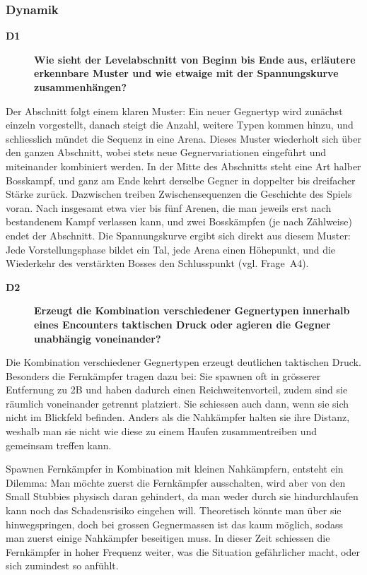 \documentclass[../Main.tex]{subfiles}
\begin{document}
\subsubsection{Dynamik}

\begin{description}
    \item[\textbf{D1}] \textbf{Wie sieht der Levelabschnitt von Beginn bis Ende aus, erläutere erkennbare Muster und wie etwaige mit der Spannungskurve zusammenhängen?}
\end{description}

Der Abschnitt folgt einem klaren Muster: Ein neuer Gegnertyp wird zunächst einzeln vorgestellt, danach steigt die Anzahl, weitere Typen kommen hinzu, und schliesslich mündet die Sequenz in eine Arena. Dieses Muster wiederholt sich über den ganzen Abschnitt, wobei stets neue Gegnervariationen eingeführt und miteinander kombiniert werden. In der Mitte des Abschnitts steht eine Art halber Bosskampf, und ganz am Ende kehrt derselbe Gegner in doppelter bis dreifacher Stärke zurück. Dazwischen treiben Zwischensequenzen die Geschichte des Spiels voran. Nach insgesamt etwa vier bis fünf Arenen, die man jeweils erst nach bestandenem Kampf verlassen kann, und zwei Bosskämpfen (je nach Zählweise) endet der Abschnitt. Die Spannungskurve ergibt sich direkt aus diesem Muster: Jede Vorstellungsphase bildet ein Tal, jede Arena einen Höhepunkt, und die Wiederkehr des verstärkten Bosses den Schlusspunkt (vgl. Frage~A4).

\begin{description}
    \item[\textbf{D2}] \textbf{Erzeugt die Kombination verschiedener Gegnertypen innerhalb eines Encounters taktischen Druck oder agieren die Gegner unabhängig voneinander?}
\end{description}

Die Kombination verschiedener Gegnertypen erzeugt deutlichen taktischen Druck. Besonders die Fernkämpfer tragen dazu bei: Sie spawnen oft in grösserer Entfernung zu 2B und haben dadurch einen Reichweitenvorteil, zudem sind sie räumlich voneinander getrennt platziert. Sie schiessen auch dann, wenn sie sich nicht im Blickfeld befinden. Anders als die Nahkämpfer halten sie ihre Distanz, weshalb man sie nicht wie diese zu einem Haufen zusammentreiben und gemeinsam treffen kann.

Spawnen Fernkämpfer in Kombination mit kleinen Nahkämpfern, entsteht ein Dilemma: Man möchte zuerst die Fernkämpfer ausschalten, wird aber von den Small Stubbies physisch daran gehindert, da man weder durch sie hindurchlaufen kann noch das Schadensrisiko eingehen will. Theoretisch könnte man über sie hinwegspringen, doch bei grossen Gegnermassen ist das kaum möglich, sodass man zuerst einige Nahkämpfer beseitigen muss. In dieser Zeit schiessen die Fernkämpfer in hoher Frequenz weiter, was die Situation gefährlicher macht, oder sich zumindest so anfühlt.
\end{document}
